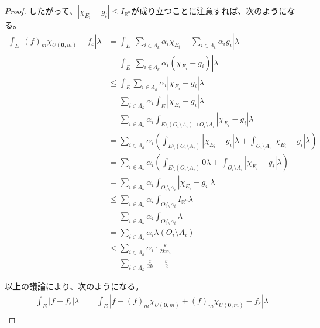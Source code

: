 \documentclass[dvipdfmx]{jsarticle}
\begin{document}
\begin{proof}
したがって、$\left| \chi_{E_{i}} - g_{i} \right| \leq I_{\mathbb{R}^{n}}$が成り立つことに注意すれば、次のようになる。
\begin{align*}
\int_{E} {\left| (f)_{m}\chi_{U\left( \mathbf{0},m \right)} - f_{\varepsilon} \right|\lambda} &= \int_{E} {\left| \sum_{i \in \varLambda_{k}} {\alpha_{i}\chi_{E_{i}}} - \sum_{i \in \varLambda_{k}} {\alpha_{i}g_{i}} \right|\lambda}\\
&= \int_{E} {\left| \sum_{i \in \varLambda_{k}} {\alpha_{i}\left( \chi_{E_{i}} - g_{i} \right)} \right|\lambda}\\
&\leq \int_{E} {\sum_{i \in \varLambda_{k}} {\alpha_{i}\left| \chi_{E_{i}} - g_{i} \right|}\lambda}\\
&= \sum_{i \in \varLambda_{k}} {\alpha_{i}\int_{E} {\left| \chi_{E_{i}} - g_{i} \right|\lambda}}\\
&= \sum_{i \in \varLambda_{k}} {\alpha_{i}\int_{E \setminus \left( O_{i} \setminus A_{i} \right) \sqcup O_{i} \setminus A_{i}} {\left| \chi_{E_{i}} - g_{i} \right|\lambda}}\\
&= \sum_{i \in \varLambda_{k}} {\alpha_{i}\left( \int_{E \setminus \left( O_{i} \setminus A_{i} \right)} {\left| \chi_{E_{i}} - g_{i} \right|\lambda} + \int_{O_{i} \setminus A_{i}} {\left| \chi_{E_{i}} - g_{i} \right|\lambda} \right)}\\
&= \sum_{i \in \varLambda_{k}} {\alpha_{i}\left( \int_{E \setminus \left( O_{i} \setminus A_{i} \right)} {0\lambda} + \int_{O_{i} \setminus A_{i}} {\left| \chi_{E_{i}} - g_{i} \right|\lambda} \right)}\\
&= \sum_{i \in \varLambda_{k}} {\alpha_{i}\int_{O_{i} \setminus A_{i}} {\left| \chi_{E_{i}} - g_{i} \right|\lambda}}\\
&\leq \sum_{i \in \varLambda_{k}} {\alpha_{i}\int_{O_{i} \setminus A_{i}} {I_{\mathbb{R}^{n}}\lambda}}\\
&= \sum_{i \in \varLambda_{k}} {\alpha_{i}\int_{O_{i} \setminus A_{i}} \lambda}\\
&= \sum_{i \in \varLambda_{k}} {\alpha_{i}\lambda\left( O_{i} \setminus A_{i} \right)}\\
&< \sum_{i \in \varLambda_{k}} {\alpha_{i} \cdot \frac{\varepsilon}{2k\alpha_{i}}}\\
&= \sum_{i \in \varLambda_{k}} \frac{\varepsilon}{2k} = \frac{\varepsilon}{2}
\end{align*}\par
以上の議論により、次のようになる。
\begin{align*}
\int_{E} {\left| f - f_{\varepsilon} \right|\lambda} &= \int_{E} {\left| f - (f)_{m}\chi_{U\left( \mathbf{0},m \right)} + (f)_{m}\chi_{U\left( \mathbf{0},m \right)} - f_{\varepsilon} \right|\lambda}\\

\end{align*}
\end{proof}
\end{document}
